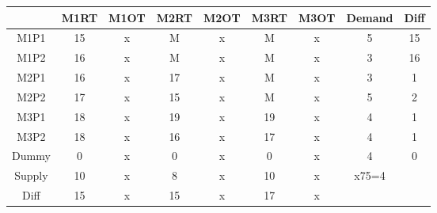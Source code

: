 \documentclass{article}%
\begin{document}
\begin{tabular}{c|cccc|c|ccc}
    & M1RT & M1OT & M2RT & M2OT & M3RT & M3OT & Demand               & Diff                 \\
    \midrule
    M1P1   & 15   & x    & M    & x    & M    & x    & 5                    & 15                   \\
    M1P2   & 16   & x    & M    & x    & M    & x    & 3                    & 16                   \\
    M2P1   & 16   & x    & 17   & x    & M    & x    & 3                    & 1                    \\
    M2P2   & 17   & x    & 15   & x    & M    & x    & 5                    & 2                    \\
    M3P1   & 18   & x    & 19   & x    & 19   & x    & 4                    & 1                    \\
    M3P2   & 18   & x    & 16   & x    & 17   & x    & 4                    & 1                    \\
    \cmidrule{2-9}
    Dummy  & 0    & x    & 0    & x    & 0    & x    & 4                    & 0                    \\
    \cmidrule{2-9}
    Supply & 10   & x    & 8    & x    & 10   & x    & x75=4                &                      \\
    Diff   & 15   & x    & 15   & x    & 17   & x    &                      &                      \\
\end{tabular}
\newline
\newline
\end{document}
